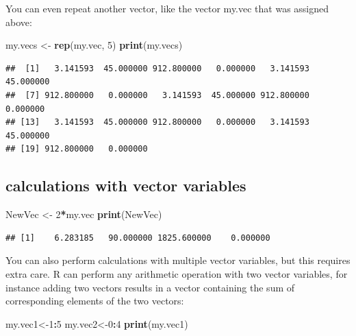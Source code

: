 \documentclass[
]{book}
\newenvironment{Shaded}{\begin{snugshade}}{\end{snugshade}}
\newcommand{\DecValTok}[1]{\textcolor[rgb]{0.00,0.00,0.81}{#1}}
\newcommand{\KeywordTok}[1]{\textcolor[rgb]{0.13,0.29,0.53}{\textbf{#1}}}
\newcommand{\NormalTok}[1]{#1}
\newcommand{\OperatorTok}[1]{\textcolor[rgb]{0.81,0.36,0.00}{\textbf{#1}}}
\newcommand{\StringTok}[1]{\textcolor[rgb]{0.31,0.60,0.02}{#1}}
\theoremstyle{definition}
\theoremstyle{definition}
\theoremstyle{definition}
\theoremstyle{remark}
\begin{document}
You can even repeat another vector, like the vector my.vec that was assigned above:

\begin{Shaded}
\begin{Highlighting}[]
\NormalTok{my.vecs \textless{}{-}}\StringTok{ }\KeywordTok{rep}\NormalTok{(my.vec, }\DecValTok{5}\NormalTok{)}
\KeywordTok{print}\NormalTok{(my.vecs)}
\end{Highlighting}
\end{Shaded}

\begin{verbatim}
##  [1]   3.141593  45.000000 912.800000   0.000000   3.141593  45.000000
##  [7] 912.800000   0.000000   3.141593  45.000000 912.800000   0.000000
## [13]   3.141593  45.000000 912.800000   0.000000   3.141593  45.000000
## [19] 912.800000   0.000000
\end{verbatim}

\hypertarget{calculations-with-vector-variables}{%
\subsection{calculations with vector variables}\label{calculations-with-vector-variables}}

\begin{Shaded}
\begin{Highlighting}[]
\NormalTok{NewVec \textless{}{-}}\StringTok{ }\DecValTok{2}\OperatorTok{*}\NormalTok{my.vec}
\KeywordTok{print}\NormalTok{(NewVec)}
\end{Highlighting}
\end{Shaded}

\begin{verbatim}
## [1]    6.283185   90.000000 1825.600000    0.000000
\end{verbatim}

You can also perform calculations with multiple vector variables, but this requires extra care. R can perform any arithmetic operation with two vector variables, for instance adding two vectors results in a vector containing the sum of corresponding elements of the two vectors:

\begin{Shaded}
\begin{Highlighting}[]
\NormalTok{my.vec1\textless{}{-}}\DecValTok{1}\OperatorTok{:}\DecValTok{5}
\NormalTok{my.vec2\textless{}{-}}\DecValTok{0}\OperatorTok{:}\DecValTok{4}
\KeywordTok{print}\NormalTok{(my.vec1)}
\end{Highlighting}
\end{Shaded}
\end{document}

